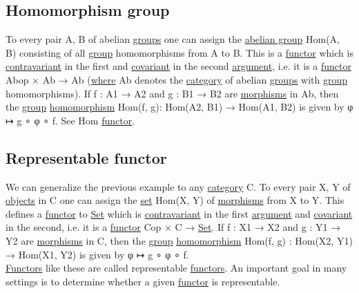 \documentclass[11pt]{article}
\begin{document}
\subsection{\label{org3663041}Homomorphism group}
\label{sec:orge99a6ef}

To every pair A, B of abelian \hyperref[org7292335]{groups} one can assign the \hyperref[org079b4e5]{abelian group} Hom(A, B) consisting of all \hyperref[org9ef38ed]{group} homomorphisms from A to B. This is a \hyperref[org6073683]{functor} which is \hyperref[org47a73bb]{contravariant} in the first and \hyperref[orgf529c7b]{covariant} in the second \hyperref[orgf66a5f7]{argument}, i.e. it is a \hyperref[org6073683]{functor} Abop × Ab → Ab (\hyperref[orgefd1ecd]{where} Ab denotes the \hyperref[org3e3a79b]{category} of abelian \hyperref[org7292335]{groups} with \hyperref[org9ef38ed]{group} homomorphisms). If f : A1 → A2 and g : B1 → B2 are \hyperref[org8ed0ce8]{morphisms} in Ab, then the \hyperref[org9ef38ed]{group} \hyperref[org01da5b8]{homomorphism} Hom(f, g): Hom(A2, B1) → Hom(A1, B2) is given by φ ↦ g ∘ φ ∘ f. See Hom \hyperref[org6073683]{functor}.\\

\subsection{\label{org042de08}Representable functor}
\label{sec:orgd45e1b4}

We can generalize the previous example to any \hyperref[org3e3a79b]{category} C. To every pair X, Y of \hyperref[orge0f000f]{objects} in C one can assign the \hyperref[orgbed80ba]{set} Hom(X, Y) of \hyperref[org8ed0ce8]{morphisms} from X to Y. This defines a \hyperref[org6073683]{functor} to \hyperref[orgbed80ba]{Set} which is \hyperref[org47a73bb]{contravariant} in the first \hyperref[orgf66a5f7]{argument} and \hyperref[orgf529c7b]{covariant} in the second, i.e. it is a \hyperref[org6073683]{functor} Cop × C → \hyperref[orgbed80ba]{Set}. If f : X1 → X2 and g : Y1 → Y2 are \hyperref[org8ed0ce8]{morphisms} in C, then the \hyperref[org9ef38ed]{group} \hyperref[org01da5b8]{homomorphism} Hom(f, g) : Hom(X2, Y1) → Hom(X1, Y2) is given by φ ↦ g ∘ φ ∘ f.\\

\hyperref[org6c3c2a6]{Functors} like these are called representable \hyperref[org6c3c2a6]{functors}. An important goal in many settings is to determine whether a given \hyperref[org6073683]{functor} is representable.\\
\end{document}
